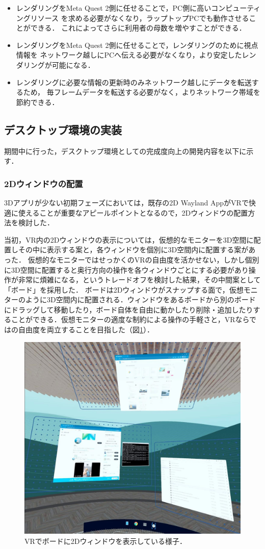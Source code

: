 \begin{itemize}
  \item レンダリングをMeta Quest 2側に任せることで，PC側に高いコンピューティングリソース
        を求める必要がなくなり，ラップトップPCでも動作させることができる．
        これによってさらに利用者の母数を増やすことができる．
  \item レンダリングをMeta Quest 2側に任せることで，レンダリングのために視点情報を
        ネットワーク越しにPCへ伝える必要がなくなり，より安定したレンダリングが可能になる．
  \item レンダリングに必要な情報の更新時のみネットワーク越しにデータを転送するため，
        毎フレームデータを転送する必要がなく，よりネットワーク帯域を節約できる．
\end{itemize}

\subsection{デスクトップ環境の実装}
期間中に行った，デスクトップ環境としての完成度向上の開発内容を以下に示す．

\subsubsection{2Dウィンドウの配置}
3Dアプリが少ない初期フェーズにおいては，既存の2D Wayland AppがVRで快適に使えることが重要なアピールポイントとなるので，2Dウィンドウの配置方法を検討した．

当初，VR内の2Dウィンドウの表示については，仮想的なモニターを3D空間に配置しその中に表示する案と，各ウィンドウを個別に3D空間内に配置する案があった．
仮想的なモニターではせっかくのVRの自由度を活かせない，しかし個別に3D空間に配置すると奥行方向の操作を各ウィンドウごとにする必要があり操作が非常に煩雑になる，というトレードオフを検討した結果，その中間案として「ボード」を採用した．
ボードは2Dウィンドウがスナップする面で，仮想モニターのように3D空間内に配置される．ウィンドウをあるボードから別のボードにドラッグして移動したり，ボード自体を自由に動かしたり削除・追加したりすることができる．仮想モニターの適度な制約による操作の手軽さと，VRならではの自由度を両立することを目指した（図\ref{fig:board-vr}）．

\begin{figure}[htbp]
  \centering
  \includegraphics[keepaspectratio, width=0.7\linewidth]{fig/development/board-vr.jpeg}
  \caption{VRでボードに2Dウィンドウを表示している様子．}
  \label{fig:board-vr}
\end{figure}

